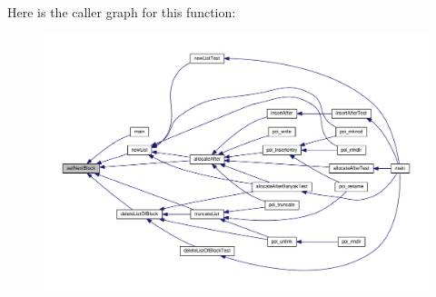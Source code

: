 Here is the caller graph for this function\-:\nopagebreak
\begin{figure}[H]
\begin{center}
\leavevmode
\includegraphics[width=350pt]{allocation-block-manager_8h_a7387272862663d2af1af9d5c21cddc84_icgraph}
\end{center}
\end{figure}


